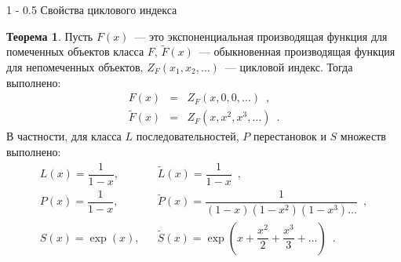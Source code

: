 \documentclass{article}
\makeatletter
\theoremstyle{definition}
\newtheorem*{theorem}{Теорема}
\renewcommand{\subsection}{\@startsection
{subsection}%
{1}%
{\z@}%
{-\baselineskip}%
{0.5\baselineskip}%
{\centering\large\scshape}} %
\makeatother
\begin{document}
\subsection{Свойства циклового индекса}

\begin{theorem}
Пусть \( F(x) \)~--- это экспоненциальная производящая функция для помеченных
объектов класса \( F \), \( \widetilde F(x) \)~--- обыкновенная производящая
функция для непомеченных объектов, \( Z_F(x_1, x_2, \ldots) \)~--- цикловой
индекс. Тогда выполнено:
\begin{eqnarray*}
    F(x) &=&  Z_F(x, 0, 0, \ldots) \enspace , \\ 
    \widetilde F(x) &=& Z_F(x, x^2, x^3, \ldots) \enspace . 
\end{eqnarray*}
В частности, для класса \( L \) последовательностей, \( P \) перестановок и \( S
\) множеств выполнено:
\begin{eqnarray*}
    L(x) = \dfrac{1}{1 - x}, && \widetilde L(x) = \dfrac{1}{1-x}\enspace  , \\
    P(x) = \dfrac{1}{1 - x}, && \widetilde P(x) = \dfrac{1}{(1-x)(1 - x^2)(1 -
x^3) \ldots} \enspace , \\
    S(x) = \exp(x), &  &
\widetilde S(x) = \exp\left( x + \dfrac{x^2}{2} + \dfrac{x^3}{3} + \ldots
\right) \enspace .
\end{eqnarray*}
\end{theorem}
\end{document}

